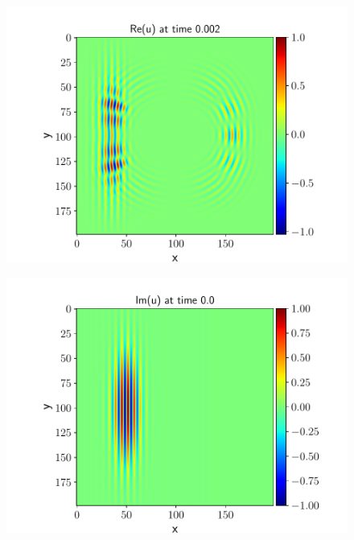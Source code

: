 \documentclass[english,notitlepage,reprint,nofootinbib]{revtex4-2}  %
\begin{document}
	\begin{figure}[h!]
		\centering
		\includegraphics[scale=0.55]{figures/real_plot_0.002.pdf}
		\caption{}
		\label{fig:prob8_Re2}
	\end{figure}

	\begin{figure}[h!]
		\centering
		\includegraphics[scale=0.55]{figures/im_plot_0.0.pdf}
		\caption{}
		\label{fig:prob8_Im0}
	\end{figure}
	
\end{document}
